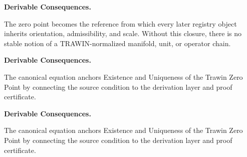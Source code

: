 \begin{minipage}[t]{0.49\linewidth}
\begin{minipage}[t]{0.49\linewidth}
\begin{minipage}[t]{0.49\linewidth}
\begin{minipage}[t]{0.49\linewidth}
\begin{minipage}[t]{0.49\linewidth}
\begin{minipage}[t]{0.49\linewidth}
\begin{minipage}[t]{0.49\linewidth}
\begin{minipage}[t]{0.49\linewidth}
\begin{minipage}[t]{0.49\linewidth}
\begin{minipage}[t]{0.49\linewidth}
\begin{minipage}[t]{0.49\linewidth}
\begin{minipage}[t]{0.49\linewidth}
\begin{minipage}[t]{0.49\linewidth}
\begin{minipage}[t]{0.49\linewidth}
\begin{minipage}[t]{0.49\linewidth}
\begin{minipage}[t]{0.49\linewidth}
\begin{minipage}[t]{0.49\linewidth}
\begin{minipage}[t]{0.49\linewidth}
\begin{minipage}[t]{0.49\linewidth}
\begin{minipage}[t]{0.49\linewidth}
\begin{minipage}[t]{0.49\linewidth}
\begin{minipage}[t]{0.49\linewidth}
\begin{minipage}[t]{0.49\linewidth}
\begin{minipage}[t]{0.49\linewidth}
\begin{minipage}[t]{0.49\linewidth}
\begin{minipage}[t]{0.49\linewidth}
\begin{minipage}[t]{0.49\linewidth}
\begin{minipage}[t]{0.49\linewidth}
\begin{minipage}[t]{0.49\linewidth}
\begin{minipage}[t]{0.49\linewidth}
\begin{minipage}[t]{0.49\linewidth}
\begin{minipage}[t]{0.49\linewidth}
\par\vspace{0.35em}
\noindent\textbf{Derivable Consequences.}\quad
\begingroup
\footnotesize
\raggedright
The zero point becomes the reference from which every later registry object inherits orientation, admissibility, and scale. Without this closure, there is no stable notion of a TRAWIN-normalized manifold, unit, or operator chain.
\par\endgroup

\par\vspace{0.35em}
\noindent\textbf{Derivable Consequences.}\quad
\begingroup
\footnotesize
\raggedright
The canonical equation anchors Existence and Uniqueness of the Trawin Zero Point by connecting the source condition to the derivation layer and proof certificate.
\par\endgroup

\par\vspace{0.35em}
\noindent\textbf{Derivable Consequences.}\quad
\begingroup
\footnotesize
\raggedright
The canonical equation anchors Existence and Uniqueness of the Trawin Zero Point by connecting the source condition to the derivation layer and proof certificate.
\par\endgroup


\end{minipage}
\end{minipage}
\end{minipage}
\end{minipage}
\end{minipage}
\end{minipage}
\end{minipage}
\end{minipage}
\end{minipage}
\end{minipage}
\end{minipage}
\end{minipage}
\end{minipage}
\end{minipage}
\end{minipage}
\end{minipage}
\end{minipage}
\end{minipage}
\end{minipage}
\end{minipage}
\end{minipage}
\end{minipage}
\end{minipage}
\end{minipage}
\end{minipage}
\end{minipage}
\end{minipage}
\end{minipage}
\end{minipage}
\end{minipage}
\end{minipage}
\end{minipage}
